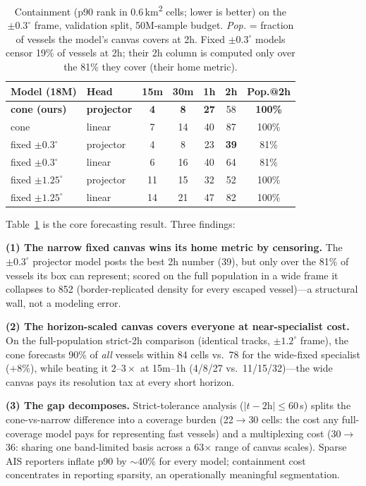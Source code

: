 \documentclass{article}
\begin{document}
\begin{table}[t]
    \centering
    \caption{Containment (p90 rank in 0.6\,km\textsuperscript{2} cells;
    lower is better) on the $\pm0.3^{\circ}$ frame, validation split,
    50M-sample budget. \emph{Pop.} = fraction of vessels the model's
    canvas covers at 2h. Fixed $\pm0.3^{\circ}$ models censor 19\% of
    vessels at 2h; their 2h column is computed only over the 81\% they
    cover (their home metric).}
    \label{tab:geometry}
    \begin{tabular}{llccccc}
        \toprule
        Model (18M) & Head & 15m & 30m & 1h & 2h & Pop.@2h \\
        \midrule
        \textbf{cone (ours)} & \textbf{projector} & \textbf{4} & \textbf{8} & \textbf{27} & 58 & \textbf{100\%} \\
        cone & linear & 7 & 14 & 40 & 87 & 100\% \\
        fixed $\pm0.3^{\circ}$ & projector & 4 & 8 & 23 & \textbf{39} & 81\% \\
        fixed $\pm0.3^{\circ}$ & linear & 6 & 16 & 40 & 64 & 81\% \\
        fixed $\pm1.25^{\circ}$ & projector & 11 & 15 & 32 & 52 & 100\% \\
        fixed $\pm1.25^{\circ}$ & linear & 14 & 21 & 47 & 82 & 100\% \\
        \bottomrule
    \end{tabular}
\end{table}

Table~\ref{tab:geometry} is the core forecasting result. Three findings:

\textbf{(1) The narrow fixed canvas wins its home metric by censoring.}
The $\pm0.3^{\circ}$ projector model posts the best 2h number (39), but
only over the 81\% of vessels its box can represent; scored on the full
population in a wide frame it collapses to 852 (border-replicated density
for every escaped vessel)---a structural wall, not a modeling error.

\textbf{(2) The horizon-scaled canvas covers everyone at near-specialist
cost.} On the full-population strict-2h comparison (identical tracks,
$\pm1.2^{\circ}$ frame), the cone forecasts 90\% of \emph{all} vessels
within 84 cells vs.\ 78 for the wide-fixed specialist ($+8\%$), while
beating it $2$--$3\times$ at 15m--1h (4/8/27 vs.\ 11/15/32)---the wide
canvas pays its resolution tax at every short horizon.

\textbf{(3) The gap decomposes.} Strict-tolerance analysis
($|t - 2\mathrm{h}| \le 60$\,s) splits the cone-vs-narrow difference into a
coverage burden (22$\to$30 cells: the cost any full-coverage model pays for
representing fast vessels) and a multiplexing cost (30$\to$36: sharing one
band-limited basis across a 63$\times$ range of canvas scales). Sparse
AIS reporters inflate p90 by $\sim$40\% for every model; containment cost
concentrates in reporting sparsity, an operationally meaningful
segmentation.
\end{document}
